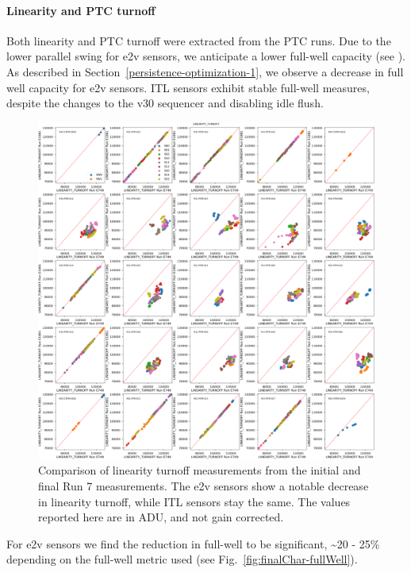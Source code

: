 \paragraph{Linearity and PTC turnoff}\label{final-linearity-and-ptc-turnoff}

Both linearity and PTC turnoff were extracted from the PTC runs. Due to the lower parallel swing for e2v sensors, we anticipate a lower full-well capacity (see \cite{2001sccd.book.....J}). As described in Section~\ref{persistence-optimization-1}, we observe a decrease in full well capacity for e2v sensors. ITL sensors exhibit stable full-well measures, despite the changes to the v30 sequencer and disabling idle flush.

\begin{figure}[ht]
    \centering
    \includegraphics[width=0.7\linewidth]{figures/finalCharacterization/E749_E1881_LINEARITY_TURNOFF.png}
    \caption{Comparison of linearity turnoff measurements from the initial and final Run 7 measurements. The e2v sensors show a notable decrease in linearity turnoff, while ITL sensors stay the same. The values reported here are in ADU, and not gain corrected.}
    \label{fig:finalChar-Linearity-5x5}
\end{figure}

For e2v sensors we find the reduction in full-well to be significant, \textasciitilde20 - 25\% depending on the full-well metric used (see Fig.~\ref{fig:finalChar-fullWell}).

